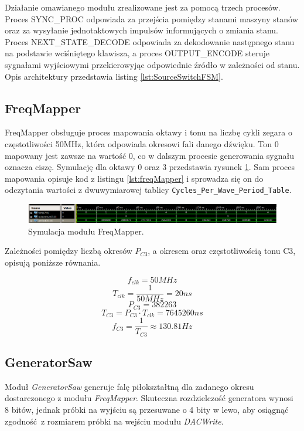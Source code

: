 \documentclass[a4paper,12pt]{article}
\begin{document}
Działanie omawianego modułu zrealizowane jest za pomocą trzech procesów. Proces SYNC\_PROC odpowiada za przejścia pomiędzy stanami maszyny stanów oraz za wysyłanie jednotaktowych impulsów informujących o zmiania stanu. Proces NEXT\_STATE\_DECODE odpowiada za dekodowanie następnego stanu na podstawie wciśniętego klawisza, a proces OUTPUT\_ENCODE steruje sygnałami wyjściowymi przekierowyjąc odpowiednie źródło w zależności od stanu. Opis architektury przedstawia listing \ref{lst:SourceSwitchFSM}.


\subsection{FreqMapper}
FreqMapper obsługuje proces mapowania oktawy i tonu na liczbę cykli zegara o częstotliwości 50MHz, która odpowiada okresowi fali danego dźwięku. Ton 0 mapowany jest zawsze na wartość 0, co w dalszym procesie generowania sygnału oznacza ciszę. Symulację dla oktawy 0 oraz 3 przedstawia rysunek \ref{sim:mapper}. Sam proces mapowania opisuje kod z listingu \ref{lst:freqMapper} i sprowadza się on do odczytania wartości z dwuwymiarowej tablicy \lstinline{Cycles_Per_Wave_Period_Table}.
\begin{figure}[h]
  \centering
  \includegraphics[decodearray={1 0 1 0 1 0}, width=\linewidth]{images/mapper}
  \caption{Symulacja modułu FreqMapper.}
  \label{sim:mapper}
\end{figure}

Zależności pomiędzy liczbą okresów $P_{C3}$, a okresem oraz częstotliwością tonu C3, opisują poniższe równania.

\[ f_{clk} = 50MHz \]
\[ T_{clk} = \frac{1}{50MHz} = 20ns \]
\[ P_{C3} = 382263 \]
\[ T_{C3} = P_{C3} \cdot T_{clk} = 7645260ns \]
\[ f_{C3} = \frac{1}{T_{C3}} \approx 130.81Hz \]




\subsection{GeneratorSaw}

Moduł \textit{GeneratorSaw} generuje falę piłokształtną dla zadanego okresu dostarczonego z modułu \textit{FreqMapper}. Skuteczna rozdzielczość generatora wynosi 8 bitów, jednak próbki na wyjściu są przesuwane o 4 bity w lewo, aby osiągnąć zgodność z rozmiarem próbki na wejściu modułu \textit{DACWrite}.
\end{document}
